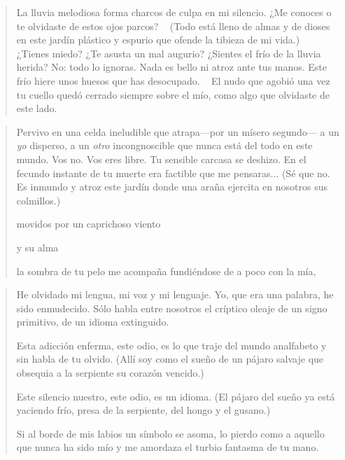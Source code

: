 \documentclass[a4paper, 12pt]{article}
\begin{document}
\pagebreak 


\begin{verse}
    
La lluvia melodiosa forma charcos 
de culpa en mi silencio. ¿Me conoces
o te olvidaste de estos ojos parcos?
~
(Todo está lleno de almas y de dioses
en este jardín plástico y espurio
que ofende la tibieza de mi vida.)
~
¿Tienes miedo? ¿Te asusta un mal augurio?
¿Sientes el frío de la lluvia herida?
No: todo lo ignoras. Nada es bello
ni atroz ante tus manos. Este frío 
hiere unos huesos que has desocupado.
~
El nudo que agobió una vez tu cuello
quedó cerrado siempre sobre el mío,
como algo que olvidaste de este lado.
~
\end{verse}




\pagebreak 

\begin{verse}

Pervivo en una celda ineludible
que atrapa---por un mísero segundo---
a un \textit{yo} disperso, a un \textit{otro} incongnoscible
que nunca está del todo en este mundo.
Vos no. Vos eres libre. Tu sensible
carcasa se deshizo. En el fecundo
instante de tu muerte era factible
que me pensaras... (Sé que no. Es inmundo 
y atroz este jardín donde una araña 
ejercita en nosotros sus colmillos.)

movidos por un caprichoso viento 






y su alma 



la sombra de tu pelo me acompaña 
fundiéndose de a poco con la mía,




\end{verse}






\pagebreak 


\begin{verse}
    He olvidado mi lengua, mi voz y mi lenguaje.
    Yo, que era una palabra, he sido enmudecido.
    Sólo habla entre nosotros el críptico oleaje 
    de un signo primitivo, de un idioma extinguido.

    Esta adicción enferma, este odio, es lo que traje 
    del mundo analfabeto y sin habla de tu olvido.
    (Allí soy como el sueño de un pájaro salvaje 
    que obsequia a la serpiente su corazón vencido.)

    Este silencio nuestro, este odio, es un idioma.
    (El pájaro del sueño ya está yaciendo frío,
    presa de la serpiente, del hongo y el gusano.)

    Si al borde de mis labios un símbolo se asoma,
    lo pierdo como a aquello que nunca ha sido mío 
    y me amordaza el turbio fantasma de tu mano.
    \end{verse}
\end{document}
